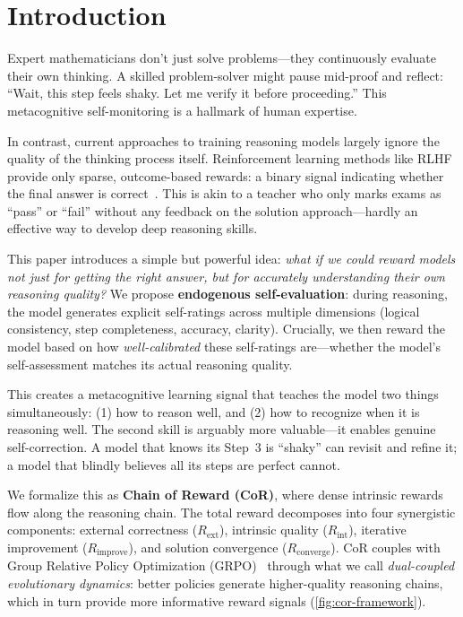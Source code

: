 \documentclass{article}
\theoremstyle{plain}
\theoremstyle{definition}
\theoremstyle{remark}
\begin{document}
\section{Introduction}
\label{sec:intro}

Expert mathematicians don't just solve problems---they continuously evaluate their own thinking. A skilled problem-solver might pause mid-proof and reflect: ``Wait, this step feels shaky. Let me verify it before proceeding.'' This metacognitive self-monitoring is a hallmark of human expertise.

In contrast, current approaches to training reasoning models largely ignore the quality of the thinking process itself. Reinforcement learning methods like RLHF provide only sparse, outcome-based rewards: a binary signal indicating whether the final answer is correct~\citep{o1,r1}. This is akin to a teacher who only marks exams as ``pass'' or ``fail'' without any feedback on the solution approach---hardly an effective way to develop deep reasoning skills.

This paper introduces a simple but powerful idea: \textit{what if we could reward models not just for getting the right answer, but for accurately understanding their own reasoning quality?} We propose \textbf{endogenous self-evaluation}: during reasoning, the model generates explicit self-ratings across multiple dimensions (logical consistency, step completeness, accuracy, clarity). Crucially, we then reward the model based on how \textit{well-calibrated} these self-ratings are---whether the model's self-assessment matches its actual reasoning quality.

This creates a metacognitive learning signal that teaches the model two things simultaneously: (1) how to reason well, and (2) how to recognize when it is reasoning well. The second skill is arguably more valuable---it enables genuine self-correction. A model that knows its Step~3 is ``shaky'' can revisit and refine it; a model that blindly believes all its steps are perfect cannot.

We formalize this as \textbf{Chain of Reward (CoR)}, where dense intrinsic rewards flow along the reasoning chain. The total reward decomposes into four synergistic components: external correctness ($R_{\text{ext}}$), intrinsic quality ($R_{\text{int}}$), iterative improvement ($R_{\text{improve}}$), and solution convergence ($R_{\text{converge}}$). CoR couples with Group Relative Policy Optimization (GRPO)~\citep{shao2024deepseekmath} through what we call \textit{dual-coupled evolutionary dynamics}: better policies generate higher-quality reasoning chains, which in turn provide more informative reward signals (\autoref{fig:cor-framework}).
\end{document}
